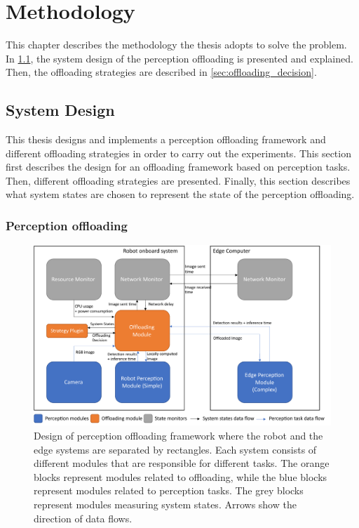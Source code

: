\chapter{Methodology}\label{ch:methodology}

This chapter describes the methodology the thesis adopts to solve the problem. In \cref{sec:system_design}, the system design of the perception offloading is presented and explained. Then, the offloading strategies are described in \cref{sec:offloading_decision}. 

\section{System Design}\label{sec:system_design}

This thesis designs and implements a perception offloading framework and different offloading strategies in order to carry out the experiments. This section first describes the design for an offloading framework based on perception tasks. Then, different offloading strategies are presented. Finally, this section describes what system states are chosen to represent the state of the perception offloading.

\subsection{Perception offloading}

\begin{figure}[htp]
    \centering
    \includegraphics[width=\linewidth]{figures/setup/system_design.pdf}
    \caption[Design of perception offloading framework]{Design of perception offloading framework where the robot and the edge systems are separated by rectangles. Each system consists of different modules that are responsible for different tasks. The orange blocks represent modules related to offloading, while the blue blocks represent modules related to perception tasks. The grey blocks represent modules measuring system states. Arrows show the direction of data flows.}
    \label{fig:perception_offloading_framework}
\end{figure}

